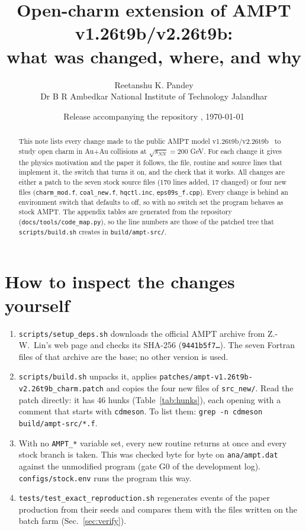 \documentclass[11pt,a4paper]{article}
\title{Open-charm extension of AMPT v1.26t9b/v2.26t9b:\\ what was changed, where, and why}
\author{Reetanshu K. Pandey\\ \small Dr B R Ambedkar National Institute of Technology Jalandhar}
\date{Release accompanying the repository \code{ampt-charm}, \today}
\newcommand{\code}[1]{\texttt{#1}}
\begin{document}
\maketitle

\begin{abstract}
This note lists every change made to the public AMPT model v1.26t9b/v2.26t9b~\cite{ampt2005,lin2021} to study open charm
in Au+Au collisions at $\sqrt{s_{NN}}=200$ GeV. For each change it gives the physics motivation and the paper it
follows, the file, routine and source lines that implement it, the switch that turns it on, and the check that it
works. All changes are either a patch to the seven stock source files (170 lines added, 17 changed) or four new files
(\code{charm\_mod.f}, \code{coal\_new.f}, \code{hqctl.inc}, \code{eps09s\_f.cpp}). Every change is behind an
environment switch that defaults to off, so with no switch set the program behaves as stock AMPT. The appendix tables
are generated from the repository (\code{docs/tools/code\_map.py}), so the line numbers are those of the patched tree
that \code{scripts/build.sh} creates in \code{build/ampt-src/}.
\end{abstract}

\tableofcontents

\section{How to inspect the changes yourself}
\begin{enumerate}
\item \code{scripts/setup\_deps.sh} downloads the official AMPT archive from Z.-W.~Lin's web page and checks its
  SHA-256 (\code{9441b5f7\ldots}). The seven Fortran files of that archive are the base; no other version is used.
\item \code{scripts/build.sh} unpacks it, applies \code{patches/ampt-v1.26t9b-v2.26t9b\_charm.patch} and copies the
  four new files of \code{src\_new/}. Read the patch directly: it has 46 hunks (Table~\ref{tab:hunks}), each opening
  with a comment that starts with \code{cdmeson}. To list them: \code{grep -n cdmeson build/ampt-src/*.f}.
\item With no \code{AMPT\_*} variable set, every new routine returns at once and every stock branch is taken. This was
  checked byte for byte on \code{ana/ampt.dat} against the unmodified program (gate G0 of the development log).
  \code{configs/stock.env} runs the program this way.
\item \code{tests/test\_exact\_reproduction.sh} regenerates events of the paper production from their seeds and
  compares them with the files written on the batch farm (Sec.~\ref{sec:verify}).
\end{enumerate}
\end{document}

